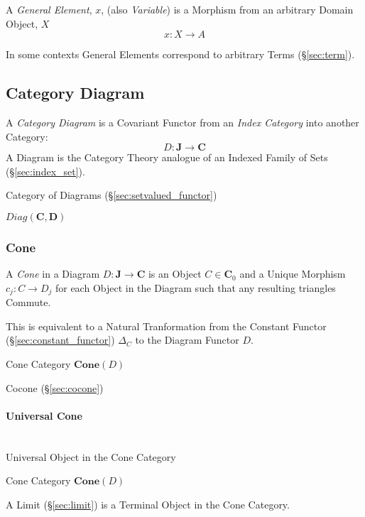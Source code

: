 A \emph{General Element}, $x$, (also \emph{Variable}) is a Morphism
from an arbitrary Domain Object, $X$
\[
  x: X \rightarrow A
\]

In some contexts General Elements correspond to arbitrary Terms
(\S\ref{sec:term}).



\subsection{Category Diagram}\label{sec:category_diagram}

A \emph{Category Diagram} is a Covariant Functor from an \emph{Index
  Category} into another Category:
\[
  D : \mathbf{J} \rightarrow \mathbf{C}
\]
A Diagram is the Category Theory analogue of an Indexed Family of Sets
(\S\ref{sec:index_set}).

Category of Diagrams (\S\ref{sec:setvalued_functor})

$Diag(\mathbf{C},\mathbf{D})$



\subsubsection{Cone}\label{sec:category_cone}

A \emph{Cone} in a Diagram $D : \mathbf{J} \rightarrow \mathbf{C}$ is
an Object $C \in \mathbf{C}_0$ and a Unique Morphism $c_j : C
\rightarrow D_j$ for each Object in the Diagram such that any
resulting triangles Commute.

This is equivalent to a Natural Tranformation from the Constant
Functor (\S\ref{sec:constant_functor}) $\Delta_C$ to the Diagram
Functor $D$.

Cone Category $\mathbf{Cone}(D)$

Cocone (\S\ref{sec:cocone})



\paragraph{Universal Cone}\label{sec:universal_cone}
\hfill \\

Universal Object in the Cone Category

Cone Category $\mathbf{Cone}(D)$

A Limit (\S\ref{sec:limit}) is a Terminal Object in the Cone
Category.



